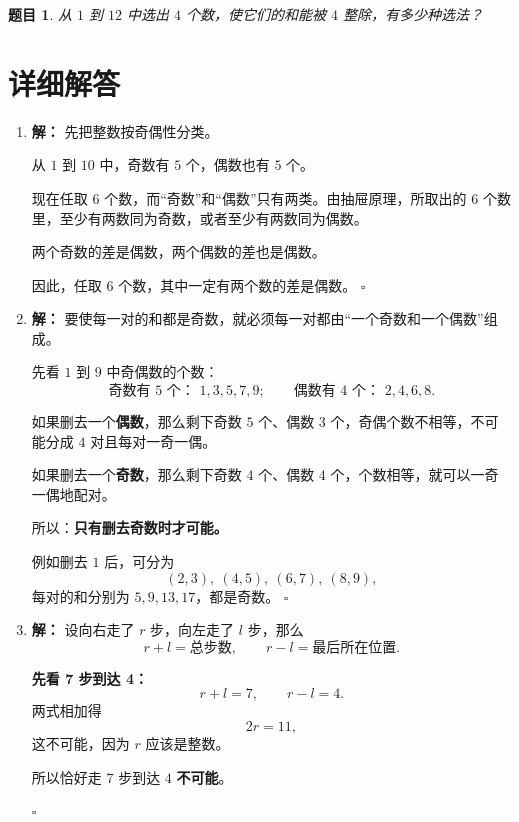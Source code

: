 \documentclass[11pt,a4paper,fontset=fandol]{ctexart}
\theoremstyle{formalexample}
\newtheorem{exercise}{题目}[section]
\newenvironment{solution}{\par\noindent\textbf{解：}}{\hfill$\square$\par}
\begin{document}
\begin{exercise}
从 $1$ 到 $12$ 中选出 $4$ 个数，使它们的和能被 $4$ 整除，有多少种选法？
\end{exercise}

\newpage
\section{详细解答}

\begin{enumerate}
  \item \begin{solution}
  先把整数按奇偶性分类。

  从 $1$ 到 $10$ 中，奇数有 $5$ 个，偶数也有 $5$ 个。

  现在任取 $6$ 个数，而“奇数”和“偶数”只有两类。由抽屉原理，所取出的 $6$ 个数里，至少有两数同为奇数，或者至少有两数同为偶数。

  两个奇数的差是偶数，两个偶数的差也是偶数。

  因此，任取 $6$ 个数，其中一定有两个数的差是偶数。
  \end{solution}

  \item \begin{solution}
  要使每一对的和都是奇数，就必须每一对都由“一个奇数和一个偶数”组成。

  先看 $1$ 到 $9$ 中奇偶数的个数：
  \[
  \text{奇数有 }5\text{ 个： }1,3,5,7,9;
  \qquad
  \text{偶数有 }4\text{ 个： }2,4,6,8.
  \]

  如果删去一个\textbf{偶数}，那么剩下奇数 $5$ 个、偶数 $3$ 个，奇偶个数不相等，不可能分成 $4$ 对且每对一奇一偶。

  如果删去一个\textbf{奇数}，那么剩下奇数 $4$ 个、偶数 $4$ 个，个数相等，就可以一奇一偶地配对。

  所以：\textbf{只有删去奇数时才可能。}

  例如删去 $1$ 后，可分为
  \[
  (2,3),\ (4,5),\ (6,7),\ (8,9),
  \]
  每对的和分别为 $5,9,13,17$，都是奇数。
  \end{solution}

  \item \begin{solution}
  设向右走了 $r$ 步，向左走了 $l$ 步，那么
  \[
  r+l=\text{总步数},
  \qquad
  r-l=\text{最后所在位置}.
  \]

  \textbf{先看 7 步到达 4：}
  \[
  r+l=7,
  \qquad
  r-l=4.
  \]
  两式相加得
  \[
  2r=11,
  \]
  这不可能，因为 $r$ 应该是整数。

  所以恰好走 $7$ 步到达 $4$ \textbf{不可能}。


\end{solution}
\end{enumerate}
\end{document}
